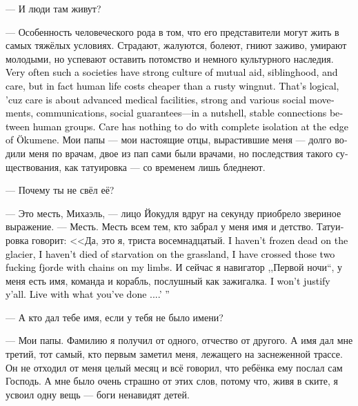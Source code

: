 \documentclass[a4paper,12pt,fleqn]{book}\usepackage{cooltooltips}\usepackage{polyglossia}\setdefaultlanguage[babelshorthands=true]{russian}\setotherlanguage{english}\defaultfontfeatures{Ligatures=TeX,Mapping=tex-text} \usepackage{xcolor}\definecolor{lightgray}{HTML}{bbbbbb}\color{lightgray}\newcommand{\ml}[3]{\textenglish{\textcolor{black}{#3}}}
\begin{document}
--- И люди там живут?

--- Особенность человеческого рода в том, что его представители могут жить в самых тяжёлых условиях.
Страдают, жалуются, болеют, гниют заживо, умирают молодыми, но успевают оставить потомство и немного культурного наследия.
\ml{$0$}
{Очень часто в таких обществах развита культура взаимопомощи, братства и заботы, но на деле человеческая жизнь там не стоит ржавой гайки.}
{Very often such a societies have strong culture of mutual aid, siblinghood, and care, but in fact human life costs cheaper than a rusty wingnut.}
\ml{$0$}
{Оно и понятно, ведь забота --- это развитая медицина, сильные и разнообразные общественные движения, коммуникации, социальные гарантии --- одним словом, стабильные связи между группами людей.}
{That's logical, 'cuz care is about advanced medical facilities, strong and various social movements, communications, social guarantees---in a nutshell, stable connections between human groups.}
\ml{$0$}
{Забота не имеет ничего общего с полной изоляцией на краю Эйкумене.}
{Care has nothing to do with complete isolation at the edge of Ökumene.}
Мои папы --- мои настоящие отцы, вырастившие меня --- долго водили меня по врачам, двое из пап сами были врачами, но последствия такого существования, как татуировка --- со временем лишь бледнеют.

--- Почему ты не свёл её?

--- Это месть, Михаэль, --- лицо Йокудля вдруг на секунду приобрело звериное выражение.
--- Месть.
Месть всем тем, кто забрал у меня имя и детство.
Татуировка говорит: <<Да, это я, триста восемнадцатый.
\ml{$0$}
{Я не умер от холода на леднике, я не сдох от голода в степи, я переплыл те два гребаных фьорда, скованный цепями по рукам и ногам.}
{I haven't frozen dead on the glacier, I haven't died of starvation on the grassland, I have crossed those two fucking fjorde with chains on my limbs.}
И сейчас я навигатор ,,Первой ночи``, у меня есть имя, команда и корабль, послушный как зажигалка.
\ml{$0$}
{Я не буду вас оправдывать.}
{I won't justify y'all.}
\ml{$0$}
{Живите с тем, что вы сделали...>>}
{Live with what you've done ....' ''}

--- А кто дал тебе имя, если у тебя не было имени?

--- Мои папы.
Фамилию я получил от одного, отчество от другого.
А имя дал мне третий, тот самый, кто первым заметил меня, лежащего на заснеженной трассе.
Он не отходил от меня целый месяц и всё говорил, что ребёнка ему послал сам Господь.
А мне было очень страшно от этих слов, потому что, живя в ските, я усвоил одну вещь --- боги ненавидят детей.
\end{document}
